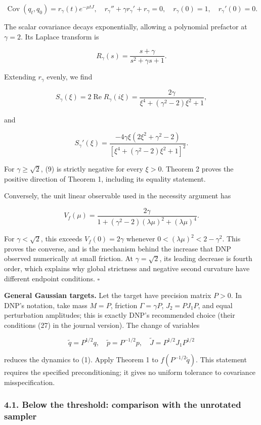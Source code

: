 \documentclass[
  british,
  11pt,
  a4paper,
]{article}
\begin{document}
\[
\mathop{\mathrm{Cov}}(q_t,q_0)=r_\gamma(t)e^{-\mu tJ},
\quad r_\gamma''+\gamma r_\gamma'+r_\gamma=0,
\quad r_\gamma(0)=1,\quad r_\gamma'(0)=0. \tag{7}
\]

The scalar covariance decays exponentially, allowing a polynomial
prefactor at \(\gamma=2\). Its Laplace transform is

\[
R_\gamma(s)=\frac{s+\gamma}{s^2+\gamma s+1}.
\]

Extending \(r_\gamma\) evenly, we find

\[
S_\gamma(\xi)=2\mathop{\mathrm{Re}}R_\gamma(i\xi)
=\frac{2\gamma}{\xi^4+(\gamma^2-2)\xi^2+1}, \tag{8}
\]

and

\[
S_\gamma'(\xi)=
\frac{-4\gamma\xi(2\xi^2+\gamma^2-2)}
{[\xi^4+(\gamma^2-2)\xi^2+1]^2}. \tag{9}
\]

For \(\gamma\ge\sqrt2\), (9) is strictly negative for every \(\xi>0\).
Theorem 2 proves the positive direction of Theorem 1, including its
equality statement.

Conversely, the unit linear observable used in the necessity argument
has

\[
V_f(\mu)=\frac{2\gamma}
{1+(\gamma^2-2)(\lambda\mu)^2+(\lambda\mu)^4}. \tag{10}
\]

For \(\gamma<\sqrt2\), this exceeds \(V_f(0)=2\gamma\) whenever
\(0<(\lambda\mu)^2<2-\gamma^2\). This proves the converse, and is the
mechanism behind the increase that DNP observed numerically at small
friction. At \(\gamma=\sqrt2\), its leading decrease is fourth order,
which explains why global strictness and negative second curvature have
different endpoint conditions. \(\square\)

\textbf{General Gaussian targets.} Let the target have precision matrix
\(P>0\). In DNP's notation, take mass \(M=P\), friction
\(\Gamma=\gamma P\), \(J_2=PJ_1P\), and equal perturbation amplitudes;
this is exactly DNP's recommended choice (their conditions (27) in the
journal version). The change of variables

\[
\widetilde q=P^{1/2}q,\quad
\widetilde p=P^{-1/2}p,\quad
\widetilde J=P^{1/2}J_1P^{1/2}
\]

reduces the dynamics to (1). Apply Theorem 1 to
\(f(P^{-1/2}\widetilde q)\). This statement requires the specified
preconditioning; it gives no uniform tolerance to covariance
misspecification.

\subsubsection{4.1. Below the threshold: comparison with the unrotated
sampler}\label{below-the-threshold-comparison-with-the-unrotated-sampler}
\end{document}
